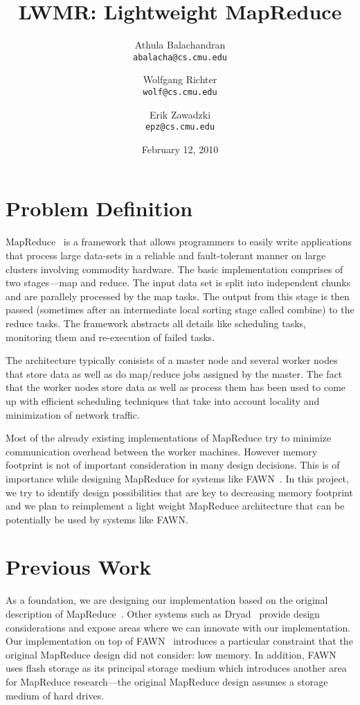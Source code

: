 \documentclass[10pt,letter,final,article,twocolumn]{article} %
\title{LWMR: Lightweight MapReduce}
\author{Athula Balachandran \\
{\tt abalacha@cs.cmu.edu}
\and
Wolfgang Richter \\
{\tt wolf@cs.cmu.edu}
\and
Erik Zawadzki \\
{\tt epz@cs.cmu.edu}}
\date{February 12, 2010} %
\begin{document}
\pagestyle{empty}
\maketitle
\thispagestyle{empty}

\section{Problem Definition}
MapReduce~\cite{mapreduce08} is a framework that allows programmers to easily write applications that process large data-sets in a reliable and fault-tolerant manner on large clusters involving commodity hardware. The basic implementation  comprises of two stages---map and reduce. The input data set is split into independent chunks and are parallely processed by the map tasks. The output from this stage is then passed (sometimes after an intermediate local sorting stage called combine) to the reduce tasks. The framework abstracts all details like scheduling tasks, monitoring them and re-execution of failed tasks. 

The architecture typically conisists of a master node and several worker nodes that store data as well as do map/reduce jobs assigned by the master. The fact that the worker nodes store data as well as process them has been used to come up with efficient scheduling techniques that take into account locality and minimization of network traffic.

Most of the already existing implementations of MapReduce try to minimize communication overhead between the worker machines. However memory footprint is not of important consideration in many design decisions. This is of importance while designing MapReduce for systems like FAWN~\cite{fawn09}. In this project, we try to identify design possibilities that are key to decreasing memory footprint and we plan to reimplement a light weight MapReduce architecture that can be potentially be used by systems like FAWN.

\section{Previous Work}

As a foundation, we are designing our implementation based on the original 
description of MapReduce~\cite{mapreduce08}.  Other systems such as
Dryad~\cite{dryad07} provide design considerations and expose areas
where we can innovate with our implementation.  Our implementation on top
of FAWN~\cite{fawn09} introduces a particular constraint that the original
MapReduce design did not consider: low memory.  In addition, FAWN uses
flash storage as its principal storage medium which introduces another
area for MapReduce research---the original MapReduce design assumes a
storage medium of hard drives.  
\end{document}
